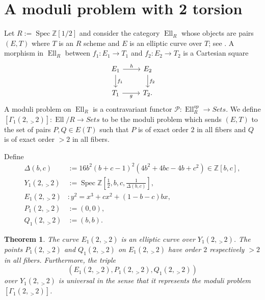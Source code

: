 \documentclass[11pt,reqno]{amsart}
\DeclareMathOperator{\Spec}{Spec}
\DeclareMathOperator{\Ell}{Ell}
\newtheorem{theorem}{Theorem}[section]
\theoremstyle{definition}
\numberwithin{equation}{section}
\newcommand{\modcrvgt}{\,_{>\,}\!}
\newcommand{\Z}{\mathbb{Z}}
\begin{document}
\section{A moduli problem with 2 torsion}

Let $R := \Spec \Z[1/2]$ and consider the category  $\Ell_R$ whose objects are pairs $(E,T)$ where $T$ is an $R$ scheme and $E$ is an elliptic curve over $T$; see \cite[Section 4.13]{KatzMazur85}. A morphism in $\Ell_R$ between $f_1: E_1 \to T_1$ and $f_2: E_2 \to T_2$ is a Cartesian square
	\[
	\begin{tikzcd}
	E_1 \arrow[r,"h"] \arrow[d,"f_1"] & E_2 \arrow[d, "f_2"] \\
	T_1 \arrow[r, "g"'] & T_2.
	\end{tikzcd}
	\] A moduli problem on $\Ell_R$ is a contravariant functor $\mathcal P : \Ell_R^{op} \to Sets$. We define $[\Gamma_1(2,\modcrvgt 2)] : \Ell/R \to Sets$ to be the moduli problem which sends $(E,T)$ to the set of pairs $P,Q \in E(T)$ such that $P$ is of exact order $2$ in all fibers and $Q$ is of exact order $>2$ in all fibers.

Define 
\begin{align*}
\Delta(b,c) &:= 16 b^2 (b + c - 1)^2(4b^2 + 4bc - 4b + c^2) \in \Z[b,c], \\
Y_1(2,\modcrvgt 2) &:= \Spec \Z\left[\frac 1 2, b,c, \frac 1 {\Delta(b,c)}\right], \\
E_1(2,\modcrvgt 2) &: y^2 =x^3 + c x^2 + (1-b-c)bx,  \\
P_1(2,\modcrvgt 2) &:= (0,0),\\
Q_1(2,\modcrvgt 2) &:= (b,b).
\end{align*}


\begin{theorem}
The curve $E_1(2,\modcrvgt 2)$ is an elliptic curve over $Y_1(2,\modcrvgt 2)$. The points $P_1(2,\modcrvgt 2)$ and $Q_1(2,\modcrvgt 2)$ on $E_1(2,\modcrvgt 2)$ have order $2$ respectively $>2$ in all fibers.
Furthermore, the triple $$(E_1(2,\modcrvgt 2),P_1(2,\modcrvgt 2),Q_1(2,\modcrvgt 2))$$ over $Y_1(2,\modcrvgt 2)$ is universal in the sense that it represents the moduli problem $[\Gamma_1(2,\modcrvgt 2)]$.
\end{theorem}
\end{document}
